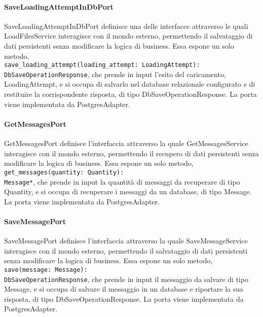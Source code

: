 \paragraph{SaveLoadingAttemptInDbPort}
\label{sec:save_loading_attempt_in_db_port}
SaveLoadingAttemptInDbPort definisce una delle interfacce attraverso le quali LoadFilesService interagisce con il mondo esterno, permettendo il salvataggio di dati persistenti senza modificare la logica di business. Essa espone un solo metodo,\\ \texttt{save\_loading\_attempt(loading\_attempt: LoadingAttempt): DbSaveOperationResponse}, che prende in input l'esito del caricamento, LoadingAttempt, e si occupa di salvarlo nel database relazionale configurato e di restituire la corrispondente risposta, di tipo DbSaveOperationResponse. La porta viene implementata da PostgresAdapter.

\paragraph{GetMessagesPort}
\label{sec:get_messages_port}
GetMessagesPort definisce l'interfaccia attraverso la quale GetMessagesService interagisce con il mondo esterno, permettendo il recupero di dati persistenti senza modificare la logica di business. Essa espone un solo metodo, \texttt{get\_messages(quantity: Quantity):\\ Message*}, che prende in input la quantità di messaggi da recuperare di tipo Quantity, e si occupa di recuperare i messaggi da un database, di tipo Message. La porta viene implementata da PostgresAdapter.

\paragraph{SaveMessagePort}
\label{sec:save_message_port}
SaveMessagePort definisce l'interfaccia attraverso la quale SaveMessageService interagisce con il mondo esterno, permettendo il salvataggio di dati persistenti senza modificare la logica di business. Essa espone un solo metodo, \texttt{save(message: Message):\\ DbSaveOperationResponse}, che prende in input il messaggio da salvare di tipo Message, e si occupa di salvare il messaggio in un database e riportare la sua risposta, di tipo DbSaveOperationResponse. La porta viene implementata da PostgresAdapter.

